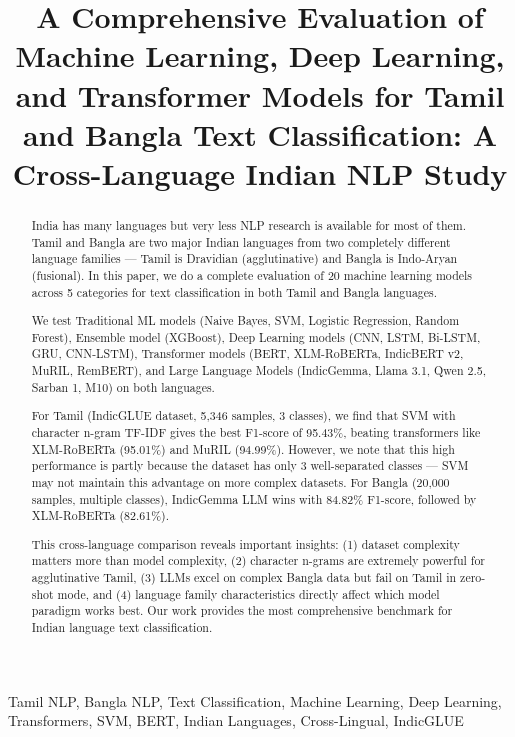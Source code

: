 \documentclass[conference]{IEEEtran}
\title{A Comprehensive Evaluation of Machine Learning, Deep Learning, and Transformer Models for Tamil and Bangla Text Classification: A Cross-Language Indian NLP Study}
\author{
\IEEEauthorblockN{Kratika Rathi, Gauri Khandelwal}
\IEEEauthorblockA{Department of Computer Science and Engineering\\
GLA University, Mathura, India\\
Under the Guidance of Dr. Ringki Das}
}
\begin{document}
\maketitle

\begin{abstract}
India has many languages but very less NLP research is available for most of them. Tamil and Bangla are two major Indian languages from two completely different language families --- Tamil is Dravidian (agglutinative) and Bangla is Indo-Aryan (fusional). In this paper, we do a complete evaluation of 20 machine learning models across 5 categories for text classification in both Tamil and Bangla languages.

We test Traditional ML models (Naive Bayes, SVM, Logistic Regression, Random Forest), Ensemble model (XGBoost), Deep Learning models (CNN, LSTM, Bi-LSTM, GRU, CNN-LSTM), Transformer models (BERT, XLM-RoBERTa, IndicBERT v2, MuRIL, RemBERT), and Large Language Models (IndicGemma, Llama 3.1, Qwen 2.5, Sarban 1, M10) on both languages.

For Tamil (IndicGLUE dataset, 5,346 samples, 3 classes), we find that SVM with character n-gram TF-IDF gives the best F1-score of 95.43\%, beating transformers like XLM-RoBERTa (95.01\%) and MuRIL (94.99\%). However, we note that this high performance is partly because the dataset has only 3 well-separated classes --- SVM may not maintain this advantage on more complex datasets. For Bangla (20,000 samples, multiple classes), IndicGemma LLM wins with 84.82\% F1-score, followed by XLM-RoBERTa (82.61\%).

This cross-language comparison reveals important insights: (1) dataset complexity matters more than model complexity, (2) character n-grams are extremely powerful for agglutinative Tamil, (3) LLMs excel on complex Bangla data but fail on Tamil in zero-shot mode, and (4) language family characteristics directly affect which model paradigm works best. Our work provides the most comprehensive benchmark for Indian language text classification.
\end{abstract}

\begin{IEEEkeywords}
Tamil NLP, Bangla NLP, Text Classification, Machine Learning, Deep Learning, Transformers, SVM, BERT, Indian Languages, Cross-Lingual, IndicGLUE
\end{IEEEkeywords}

\end{document}
